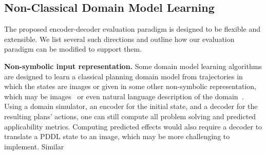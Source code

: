 \documentclass{article}
\newcommand{\miniparagraph}[1]{\textbf{#1.}}
\theoremstyle{definition}
\theoremstyle{remark}
\newif\ifaddcomments
\newcommand{\roni}[1]{\ifaddcomments{\textcolor{red}{[Roni: #1]}}\fi}
\newcommand{\yarin}[1]{\ifaddcomments{\textcolor{teal}{[Yarin: #1]}}\fi}
\begin{document}






\subsection{Non-Classical Domain Model Learning}
The proposed encoder-decoder evaluation paradigm is designed to be flexible and extensible. 
We list several such directions and outline how our evaluation paradigm can be modified to support them. 

\miniparagraph{Non-symbolic input representation}
Some domain model learning algorithms are designed to learn a classical planning domain model from trajectories in which the states are images or given in some other non-symbolic representation, which may be images~\citep{asai2020learning,asai2022classical,xi2024neuro} or even natural language description of the domain~\citep{lindsay2017framer,liu2023llm+, guan2023leveraging}.\roni{Maybe some recent LLM-based approach?} 
Using a domain simulator, an encoder for the initial state, and a decoder for the resulting plans' actions, one can still compute all problem solving and predicted applicability metrics. 
Computing predicted effects would also require a decoder to translate a PDDL state to an image, which may be more challenging to implement. 
Similar\yarin{the word left in by mistake?}
\end{document}
